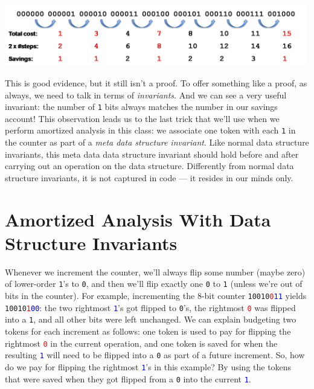 \begin{center}
\includegraphics[width=0.99\textwidth]{img/bincount3.png}
\end{center}
This is good evidence, but it still isn't a proof. To offer something
like a proof, as always, we need to talk in terms of
\emph{invariants}. And we can see a very useful invariant: the number
of \lstinline'1' bits always matches the number in our savings
account!  This observation leads us to the last trick that we'll use
when we perform amortized analysis in this class: we associate one
token with each \lstinline'1' in the counter as part of a \emph{meta
  data structure invariant}.  Like normal data structure invariants,
this meta data data structure invariant should hold before and after
carrying out an operation on the data structure.  Differently from
normal data structure invariants, it is not captured in code --- it
resides in our minds only.


\section{Amortized Analysis With Data Structure Invariants}
\label{sec:ubarrays:potential_method}

Whenever we increment the counter, we'll always flip some number
(maybe zero) of lower-order \lstinline'1''s to \lstinline'0', and then
we'll flip exactly one \lstinline'0' to \lstinline'1' (unless we're
out of bits in the counter).  For example, incrementing the 8-bit
counter
\lstinline'10010'\textcolor{red}{\lstinline'0'}\textcolor{blue}{\lstinline'11'}
yields
\lstinline'10010'\textcolor{red}{\lstinline'1'}\textcolor{blue}{\lstinline'00'}:
the two rightmost \textcolor{blue}{\lstinline'1'}'s got flipped to
\lstinline'0''s, the rightmost \textcolor{red}{\lstinline'0'} was
flipped into a \lstinline'1', and all other bits were left unchanged.
We can explain budgeting two tokens for each increment as follows: one
token is used to pay for flipping the rightmost
\textcolor{red}{\lstinline'0'} in the current operation, and one token
is saved for when the resulting \textcolor{blue}{\lstinline'1'} will
need to be flipped into a \lstinline'0' as part of a future increment.
So, how do we pay for flipping the rightmost
\textcolor{blue}{\lstinline'1'}'s in this example?  By using the
tokens that were saved when they got flipped from a \lstinline'0'
into the current \textcolor{blue}{\lstinline'1'}.

